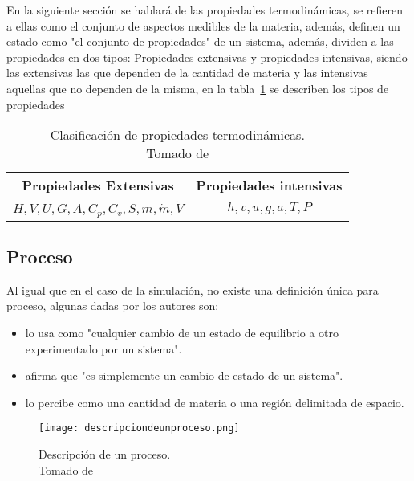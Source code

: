 En la siguiente sección se hablará de las propiedades termodinámicas, \textcite{ccengel2006termodinamica} se refieren a ellas como el conjunto de aspectos medibles de la materia, además, \textcite{shapirotermo} definen un estado como "el conjunto de propiedades" de un sistema, además, dividen a las propiedades en dos tipos: Propiedades extensivas y propiedades intensivas, siendo las extensivas las que dependen de la cantidad de materia y las intensivas aquellas que no dependen de la misma, en la tabla~\ref{tab:propied12} se describen los tipos de propiedades 

\begin{table}[H]
    \centering
    \caption{Clasificación de propiedades termodinámicas. \\ Tomado de \textcite{ccengel2006termodinamica}}
    \label{tab:propied12}

    \begin{tabular}{cc}
      \hline
      Propiedades Extensivas       & Propiedades intensivas \\
      \hline
      $H,V,U,G,A,C_p,C_v,S,m,\dot{m},\dot{V}$ & $h,v,u,g,a,T,P$ \\
      \hline
    \end{tabular}
  \end{table}


\subsection{Proceso}

Al igual que en el caso de la simulación, no existe una definición única para proceso, algunas dadas por los autores son:

\begin{itemize}
    \item \textcite{ccengel2006termodinamica} lo usa como "cualquier cambio de un estado de equilibrio a otro experimentado por un sistema".
    \item \textcite{burghardt1984ingenieria} afirma que "es simplemente un cambio de estado de un sistema".
    \item \textcite{rajput2009engineering} lo percibe como una cantidad de materia o una región delimitada de espacio.
\end{itemize}

\vspace{-36pt}
\begin{center}
    \begin{figure}[H]
    \centering
    \texttt{[image: descripciondeunproceso.png]}
    \centering
    \caption{Descripción de un proceso. \\ Tomado de \protect\textcite{ccengel2006termodinamica}}
    \label{fig:proc1}
\end{figure}
\end{center}

